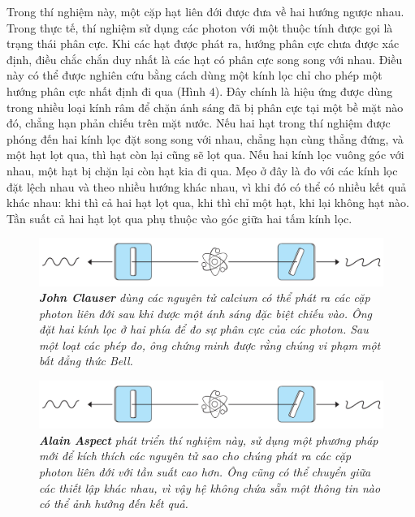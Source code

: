 \begin{multicols}{2}
	\vskip 0.1cm
	Trong thí nghiệm này, một cặp hạt liên đới được đưa về hai hướng ngược nhau. Trong thực tế, thí nghiệm sử dụng các photon với một thuộc tính được gọi là trạng thái phân cực. Khi các hạt được phát ra, hướng phân cực chưa được xác định, điều chắc chắn duy nhất là các hạt có phân cực song song với nhau. Điều này có thể được nghiên cứu bằng cách dùng một kính lọc chỉ cho phép một hướng phân cực nhất định đi qua (Hình $4$). Đây chính là hiệu ứng được dùng trong nhiều loại kính râm để chặn ánh sáng đã bị phân cực tại một bề mặt nào đó, chẳng hạn phản chiếu trên mặt nước.
	\vskip 0.1cm
	Nếu hai hạt trong thí nghiệm được phóng đến hai kính lọc đặt song song với nhau, chẳng hạn cùng thẳng đứng, và một hạt lọt qua, thì hạt còn lại cũng sẽ lọt qua. Nếu hai kính lọc vuông góc với nhau, một hạt bị chặn lại còn hạt kia đi qua. Mẹo ở đây là đo với các kính lọc đặt lệch nhau và theo nhiều hướng khác nhau, vì khi đó có thể có nhiều kết quả khác nhau: khi thì cả hai hạt lọt qua, khi thì chỉ một hạt, khi lại không hạt nào. Tần suất cả hai hạt lọt qua phụ thuộc vào góc giữa hai tấm kính lọc.
	\begin{figure}[H]
		\vspace*{-5pt}
		\centering
		\captionsetup{labelformat= empty, justification=centering}
		\includegraphics[width= 1\linewidth]{4}
		\caption{\small\textit{\color{timhieukhoahoc}\textbf{\color{timhieukhoahoc}John Clauser} dùng các nguyên tử calcium có thể phát ra các cặp photon liên đới sau khi được một ánh sáng đặc biệt chiếu vào. Ông đặt hai kính lọc ở hai phía để đo sự phân cực của các photon. Sau một loạt các phép đo, ông chứng minh được rằng chúng vi phạm một bất đẳng thức Bell.}}
		\vspace*{-10pt}
	\end{figure}
	\begin{figure}[H]
		\vspace*{-5pt}
		\centering
		\captionsetup{labelformat= empty, justification=centering}
		\includegraphics[width= 1\linewidth]{4}
		\caption{\small\textit{\color{timhieukhoahoc}\textbf{\color{timhieukhoahoc}Alain Aspect} phát triển thí nghiệm này, sử dụng một phương pháp mới để kích thích các nguyên tử sao cho chúng phát ra các cặp photon liên đới với tần suất cao hơn. Ông cũng có thể chuyển giữa các thiết lập khác nhau, vì vậy hệ không chứa sẵn một thông tin nào có thể ảnh hưởng đến kết quả.}}

\end{figure}
\end{multicols}
